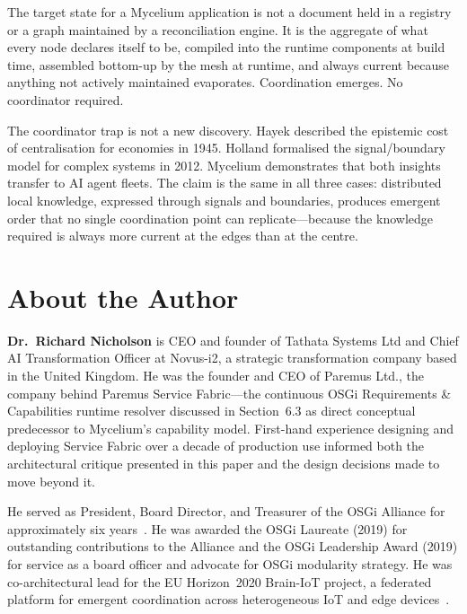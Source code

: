 \documentclass[11pt]{article}
\begin{document}
The target state for a Mycelium application is not a document held in a registry
or a graph maintained by a reconciliation engine. It is the aggregate of what
every node declares itself to be, compiled into the runtime components at build
time, assembled bottom-up by the mesh at runtime, and always current because
anything not actively maintained evaporates. Coordination emerges. No coordinator
required.

The coordinator trap is not a new discovery. Hayek described the epistemic cost
of centralisation for economies in 1945. Holland formalised the signal/boundary
model for complex systems in 2012. Mycelium demonstrates that both insights
transfer to AI agent fleets. The claim is the same in all three cases:
distributed local knowledge, expressed through signals and boundaries, produces
emergent order that no single coordination point can replicate---because the
knowledge required is always more current at the edges than at the centre.



\section*{About the Author}

\textbf{Dr.\ Richard Nicholson} is CEO and founder of Tathata Systems Ltd and
Chief AI Transformation Officer at Novus-i2, a strategic transformation company
based in the United Kingdom. He was the founder and CEO of Paremus Ltd., the
company behind Paremus Service Fabric---the continuous OSGi Requirements \&
Capabilities runtime resolver discussed in Section~6.3 as direct conceptual
predecessor to Mycelium's capability model. First-hand experience designing and
deploying Service Fabric over a decade of production use informed both the
architectural critique presented in this paper and the design decisions made to
move beyond it.

He served as President, Board Director, and Treasurer of the OSGi Alliance for
approximately six years~\cite{osgi-mod,osgi-cmb}. He was awarded the OSGi Laureate
(2019) for outstanding contributions to the Alliance and the OSGi Leadership Award
(2019) for service as a board officer and advocate for OSGi modularity strategy.
He was co-architectural lead for the EU Horizon~2020 Brain-IoT project, a
federated platform for emergent coordination across heterogeneous IoT and edge
devices~\cite{brain-iot-1,brain-iot-2}.
\end{document}
